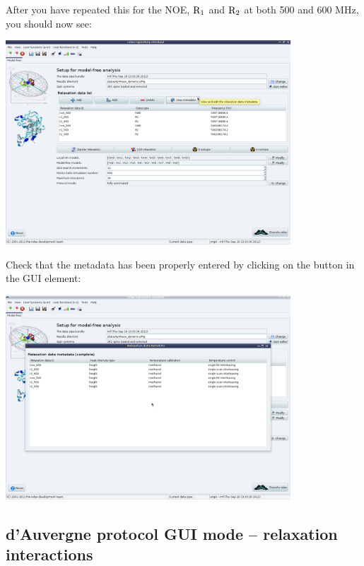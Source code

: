 \begin{htmlonly}
\begin{htmlonly}
After you have repeated this for the NOE, $\mathrm{R}_1$ and $\mathrm{R}_2$ at both 500 and 600 MHz, you should now see:

\begin{minipage}[h]{\linewidth}
\centerline{\includegraphics[width=0.8\textwidth, bb=14 14 1415 1019]{graphics/screenshots/mf_analysis/analysis_tab_full}}
\end{minipage}

Check that the metadata has been properly entered by clicking on the  button in the  GUI element:

\begin{minipage}[h]{\linewidth}
\centerline{\includegraphics[width=0.8\textwidth, bb=14 14 1415 1019]{graphics/screenshots/mf_analysis/metadata}}
\end{minipage}



\subsection{d'Auvergne protocol GUI mode -- relaxation interactions}


\end{htmlonly}
\end{htmlonly}

